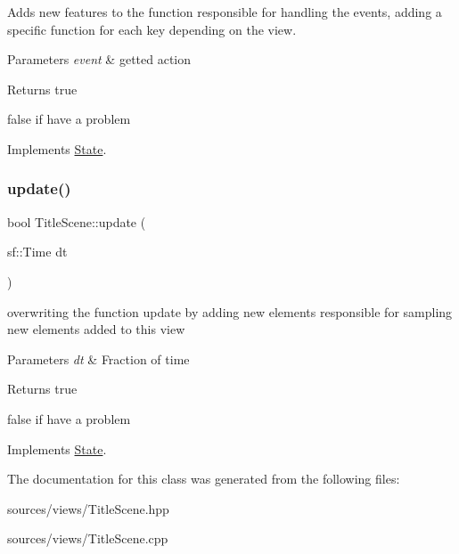Adds new features to the function responsible for handling the events, adding a specific function for each key depending on the view. 


\begin{DoxyParams}{Parameters}
{\em event} & getted action \\
\hline
\end{DoxyParams}
\begin{DoxyReturn}{Returns}
true 

false if have a problem 
\end{DoxyReturn}


Implements \hyperlink{classState_a19965f83460b248c42952aac8d001206}{State}.

\mbox{\label{classTitleScene_a7da09182894a7a48a12ed0e170e5b5f3}} 
\subsubsection{\texorpdfstring{update()}{update()}}
{\footnotesize\ttfamily bool Title\+Scene\+::update (\begin{DoxyParamCaption}\item[{sf\+::\+Time}]{dt }\end{DoxyParamCaption})\hspace{0.3cm}{\ttfamily [virtual]}}



overwriting the function update by adding new elements responsible for sampling new elements added to this view 


\begin{DoxyParams}{Parameters}
{\em dt} & Fraction of time \\
\hline
\end{DoxyParams}
\begin{DoxyReturn}{Returns}
true 

false if have a problem 
\end{DoxyReturn}


Implements \hyperlink{classState_acd5926bc7a373edff9e57f3ffe94ca13}{State}.



The documentation for this class was generated from the following files\+:\begin{DoxyCompactItemize}
\item 
sources/views/Title\+Scene.\+hpp\item 
sources/views/Title\+Scene.\+cpp\end{DoxyCompactItemize}
